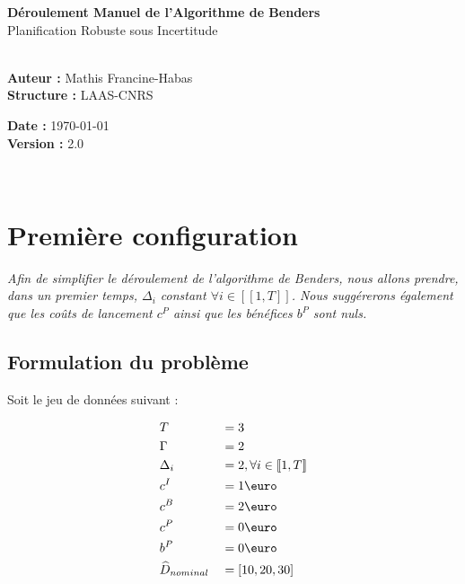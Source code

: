 \documentclass[11pt,a4paper]{article}
\begin{document}
\begin{center}
    {\color{mainblue}\LARGE\bfseries Déroulement Manuel de l'Algorithme de Benders}\\[0.3cm]
    {\color{slate}\large Planification Robuste sous Incertitude}\\[0.5cm]
    \noindent\makebox[\linewidth]{\color{bordergrey}\rule{\linewidth}{1pt}}\\[0.2cm]
    \begin{minipage}{0.48\textwidth}
        \begin{flushleft} \small
            \textbf{Auteur :} Mathis Francine-Habas \\
            \textbf{Structure :} LAAS-CNRS
        \end{flushleft}
    \end{minipage}
    \hfill
    \begin{minipage}{0.48\textwidth}
        \begin{flushright} \small
            \textbf{Date :} \today \\
            \textbf{Version :} 2.0
        \end{flushright}
    \end{minipage}\\[0.1cm]
    \noindent\makebox[\linewidth]{\color{bordergrey}\rule{\linewidth}{1pt}}
\end{center}

\vspace{0.4cm}


\section{Première configuration}
\label{sec:formulation1}

\textit{Afin de simplifier le déroulement de l'algorithme de Benders, nous allons prendre,  dans un premier temps, $\Delta_i$ constant $\forall i\in[\![1, T]\!]$. Nous suggérerons également que les coûts de lancement $c^P$ ainsi que les bénéfices $b^P$ sont nuls.}


\subsection{Formulation du problème}

Soit le jeu de données suivant :

\begin{alignat}{5}
    &T&&=3\\
    &\Gamma&&=2\\
    &\Delta_i&&=2, \forall i\in[\![1, T]\!]\\
    &c^I&&=1\text{\euro}\\
    &c^B&&=2\text{\euro}\\
    &c^P&&=0\text{\euro}\\
    &b^P&&=0\text{\euro}\\
    &\widehat{D}_{nominal}&&=[10, 20, 30]
\end{alignat}
\end{document}
